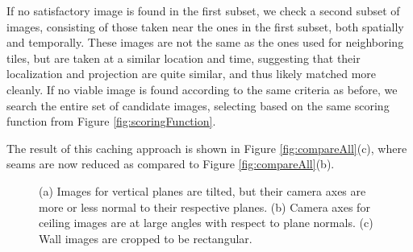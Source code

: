 \documentclass[]{spie}  %
\begin{document}
If no satisfactory image is found in the first subset, we check a
second subset of images, consisting of those taken near the ones in
the first subset, both spatially and temporally. These images are not
the same as the ones used for neighboring tiles, but are taken at a
similar location and time, suggesting that their localization and
projection are quite similar, and thus likely matched more cleanly. If
no viable image is found according to the same criteria as before, we
search the entire set of candidate images, selecting based on the same
scoring function from Figure \ref{fig:scoringFunction}.

The result of this caching approach is shown in Figure
\ref{fig:compareAll}(c), where seams are now reduced as
compared to Figure \ref{fig:compareAll}(b).

\begin{figure}
  \centering
  \centering
  \centering
  \caption{(a) Images for vertical planes are tilted, but their camera
    axes are more or less normal to their respective planes. (b)
    Camera axes for ceiling images are at large angles with respect to
    plane normals. (c) Wall images are cropped to be rectangular.}
  \label{fig:projectionAngles}
\end{figure}
\end{document}
